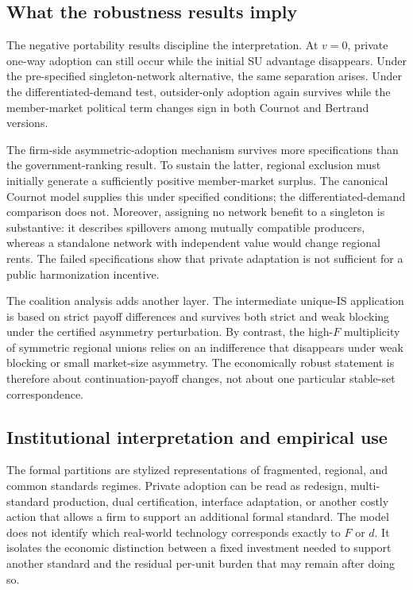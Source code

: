\subsection{What the robustness results imply}
\label{subsec:discussion-robustness}

The negative portability results discipline the interpretation. At $v=0$, private one-way adoption can still occur while the initial SU advantage disappears. Under the pre-specified singleton-network alternative, the same separation arises. Under the differentiated-demand test, outsider-only adoption again survives while the member-market political term changes sign in both Cournot and Bertrand versions.

The firm-side asymmetric-adoption mechanism survives more specifications than the government-ranking result. To sustain the latter, regional exclusion must initially generate a sufficiently positive member-market surplus. The canonical Cournot model supplies this under specified conditions; the differentiated-demand comparison does not. Moreover, assigning no network benefit to a singleton is substantive: it describes spillovers among mutually compatible producers, whereas a standalone network with independent value would change regional rents. The failed specifications show that private adaptation is not sufficient for a public harmonization incentive.

The coalition analysis adds another layer. The intermediate unique-IS application is based on strict payoff differences and survives both strict and weak blocking under the certified asymmetry perturbation. By contrast, the high-$F$ multiplicity of symmetric regional unions relies on an indifference that disappears under weak blocking or small market-size asymmetry. The economically robust statement is therefore about continuation-payoff changes, not about one particular stable-set correspondence.

\subsection{Institutional interpretation and empirical use}
\label{subsec:discussion-institutions}

The formal partitions are stylized representations of fragmented, regional, and common standards regimes. Private adoption can be read as redesign, multi-standard production, dual certification, interface adaptation, or another costly action that allows a firm to support an additional formal standard. The model does not identify which real-world technology corresponds exactly to $F$ or $d$. It isolates the economic distinction between a fixed investment needed to support another standard and the residual per-unit burden that may remain after doing so.

